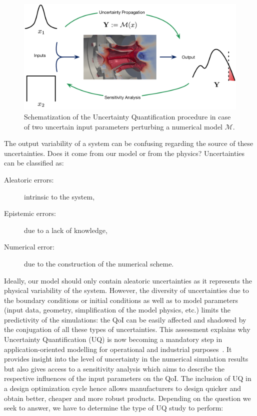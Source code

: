 \begin{figure}[!ht]
\centering
\includegraphics[width=\linewidth,keepaspectratio]{fig/literature/schema_UQ.pdf}
\caption{Schematization of the Uncertainty Quantification procedure in case of two uncertain input parameters perturbing a numerical model $\mathcal{M}$.}
\label{fig:context}
\end{figure}

The output variability of a system can be confusing regarding the source of these uncertainties. Does it come from our model or from the physics? Uncertainties can be classified as:

\begin{description}
	\item [Aleatoric errors:] intrinsic to the system,
	\item [Epistemic errors:] due to a lack of knowledge,%
	\item [Numerical error:] due to the construction of the numerical scheme.
\end{description}

Ideally, our model should only contain aleatoric uncertainties as it represents the physical variability of the system. However, the diversity of uncertainties due to the boundary conditions or initial conditions as well as to model parameters (input data, geometry, simplification of the model physics, etc.) limits the predictivity of the simulations: the QoI can be easily affected and shadowed by the conjugation of all these types of uncertainties. This assessment explains why Uncertainty Quantification (UQ) is now becoming a mandatory step in application-oriented modelling for operational and industrial purposes~\cite{degennaro2015,masquelet2017}. It provides insight into the level of uncertainty in the numerical simulation results but also gives access to a sensitivity analysis which aims to describe the respective influences of the input parameters on the QoI. The inclusion of UQ in a design optimization cycle hence allows manufacturers to design quicker and obtain better, cheaper and more robust products. Depending on the question we seek to answer, we have to determine the type of UQ study to perform:

